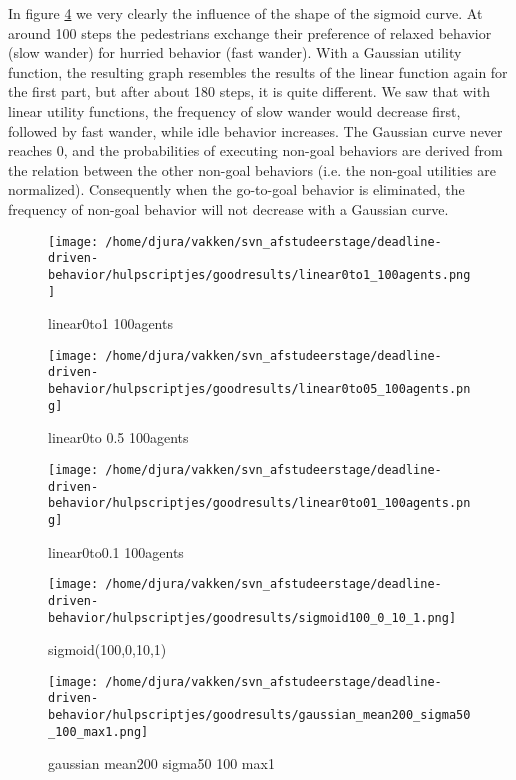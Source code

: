 \documentclass[11pt]{book}
\begin{document}
In figure \ref{fig:sigmoid100_0_10_1} we very clearly the influence of the shape of the sigmoid curve. At around 100 steps the pedestrians exchange their preference of relaxed behavior (slow wander) for hurried behavior (fast wander). With a Gaussian utility function, the resulting graph resembles the results of the linear function again for the first part, but after about 180 steps, it is quite different. We saw that with linear utility functions, the frequency of slow wander would decrease first, followed by fast wander, while idle behavior increases. The Gaussian curve never reaches 0, and the probabilities of executing non-goal behaviors are derived from the relation between the other non-goal behaviors (i.e. the non-goal utilities are normalized). Consequently when the go-to-goal behavior is eliminated, the frequency of non-goal behavior will not decrease with a Gaussian curve.

\begin{figure}
\centering
\texttt{[image: /home/djura/vakken/svn\_afstudeerstage/deadline-driven-behavior/hulpscriptjes/goodresults/linear0to1\_100agents.png]}
\caption{linear0to1 100agents}
\label{fig:linear0to1_100agents}
\end{figure}


\begin{figure}
\centering
\texttt{[image: /home/djura/vakken/svn\_afstudeerstage/deadline-driven-behavior/hulpscriptjes/goodresults/linear0to05\_100agents.png]}
\caption{linear0to 0.5 100agents}
\label{fig:linear0to0.5_100agents}
\end{figure}

\begin{figure}
\centering
\texttt{[image: /home/djura/vakken/svn\_afstudeerstage/deadline-driven-behavior/hulpscriptjes/goodresults/linear0to01\_100agents.png]}
\caption{linear0to0.1 100agents}
\label{fig:linear0to01_100agents}
\end{figure}

\begin{figure}
\centering
\texttt{[image: /home/djura/vakken/svn\_afstudeerstage/deadline-driven-behavior/hulpscriptjes/goodresults/sigmoid100\_0\_10\_1.png]}
\caption{sigmoid(100,0,10,1)}
\label{fig:sigmoid100_0_10_1}
\end{figure}

\begin{figure}
\centering
\texttt{[image: /home/djura/vakken/svn\_afstudeerstage/deadline-driven-behavior/hulpscriptjes/goodresults/gaussian\_mean200\_sigma50\_100\_max1.png]}
\caption{gaussian mean200 sigma50 100 max1}
\label{fig:gaussian_mean200_sigma50_100_max1}
\end{figure}
\end{document}
